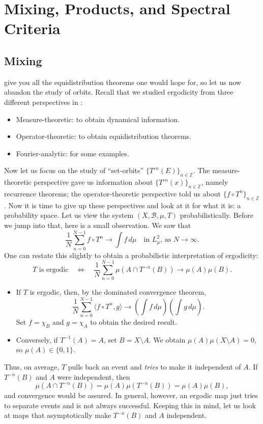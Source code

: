 \documentclass[11pt,a4paper]{article}
\begin{document}
\section*{Mixing, Products, and Spectral Criteria}
\subsection{Mixing}
 give you all the equidistribution theorems one would hope
for, so let us now abandon the study of orbits. Recall that we studied
ergodicity from three different perspectives in :
\begin{itemize}
 \item Measure-theoretic: to obtain dynamical information.
 \item Operator-theoretic: to obtain equidistribution theorems.
 \item Fourier-analytic: for some examples.
\end{itemize}
Now let us focus on the study of ``set-orbits''
$\{T^{\circ n}(E)\}_{n\in\mathbb Z}$. The measure-theoretic perspective
gave us information about $\{T^{\circ n}(x)\}_{n\in\mathbb Z}$, namely
recurrence theorems; the operator-theoretic perspective told us about
$\{f\circ T^n\}_{n\in\mathbb Z}$. Now it is time to give up these
perspectives and look at it for what it is: a probability space. Let us view
the system $(X,\mathcal B,\mu,T)$ probabilistically. Before we jump into that,
here is a small observation. We saw that
\[
 \frac1N\sum_{n=0}^{N-1}f\circ T^n\longrightarrow\int f\,d\mu
 \quad\text{in $L^2_\mu$, as $N\to\infty$.}
\]
One can restate this slightly to obtain a probabilistic interpretation
of ergodicity:
\[
 T\text{ is ergodic}
 \quad\Longleftrightarrow\quad
 \frac1N\sum_{n=0}^{N-1}\mu(A\cap T^{-n}(B))
 \longrightarrow\mu(A)\mu(B).
\]
\begin{itemize}
 \item If $T$ is ergodic, then, by the dominated convergence theorem,
 \[
  \frac1N\sum_{n=0}^{N-1}\langle f\circ T^n,g\rangle
  \longrightarrow\left(\int f\,d\mu\right)\left(\int g\,d\mu\right).
 \]
 Set $f=\chi_B$ and $g=\chi_A$ to obtain the desired result.
 \item Conversely, if $T^{-1}(A)=A$, set $B=X\setminus A$. We obtain
 $\mu(A)\mu(X\setminus A)=0$, so $\mu(A)\in\{0,1\}$.
\end{itemize}
Thus, on average, $T$ pulls back an event and \emph{tries} to make it
independent of $A$. If $T^{-n}(B)$ and $A$ were independent, then
\[
 \mu(A\cap T^{-n}(B))
 =\mu(A)\mu(T^{-n}(B))=\mu(A)\mu(B),
\]
and convergence would be assured. In general, however, an ergodic map just
tries to separate events and is not always successful. Keeping this in mind,
let us look at maps that asymptotically make $T^{-n}(B)$ and $A$ independent.
\end{document}
